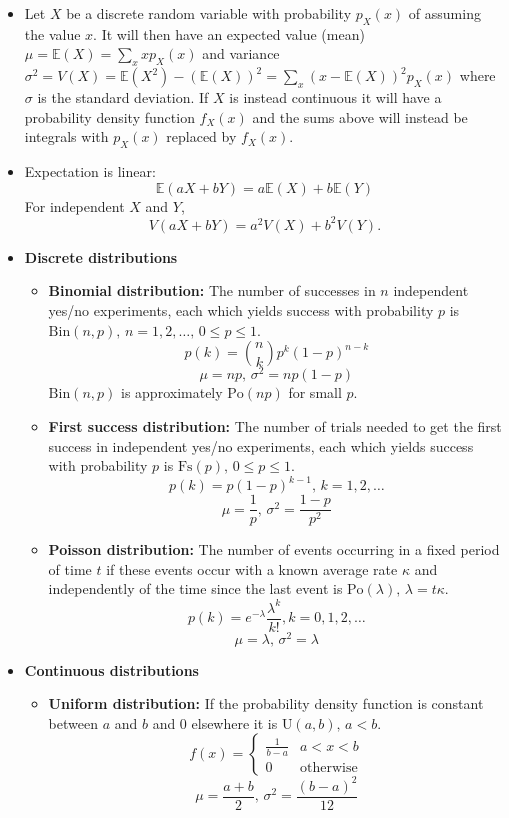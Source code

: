 \vspace{2.5mm}
\begin{itemize}
    \item Let $X$ be a discrete random variable with probability $p_X(x)$ of assuming the value $x$. It will then have an expected value (mean) $\mu=\mathbb{E}(X)=\sum_xxp_X(x)$ and variance $\sigma^2=V(X)=\mathbb{E}(X^2)-(\mathbb{E}(X))^2=\sum_x(x-\mathbb{E}(X))^2p_X(x)$ where $\sigma$ is the standard deviation. If $X$ is instead continuous it will have a probability density function $f_X(x)$ and the sums above will instead be integrals with $p_X(x)$ replaced by $f_X(x)$.

    \item Expectation is linear:
    \[\mathbb{E}(aX+bY) = a\mathbb{E}(X)+b\mathbb{E}(Y)\]
    For independent $X$ and $Y$, \[V(aX+bY) = a^2V(X)+b^2V(Y).\]

    \item \textbf{Discrete distributions}
    \begin{itemize}
        \item \textbf{Binomial distribution:} The number of successes in $n$ independent yes/no experiments, each which yields success with probability $p$ is $\textrm{Bin}(n,p),\,n=1,2,\dots,\, 0\leq p\leq1$.
        \[p(k)=\binom{n}{k}p^k(1-p)^{n-k}\]
        \[\mu = np,\,\sigma^2=np(1-p)\]
        $\textrm{Bin}(n,p)$ is approximately $\textrm{Po}(np)$ for small $p$.

        \item \textbf{First success distribution:} The number of trials needed to get the first success in independent yes/no experiments, each which yields success with probability $p$ is $\textrm{Fs}(p),\,0\leq p\leq1$.
        \[p(k)=p(1-p)^{k-1},\,k=1,2,\dots\]
        \[\mu = \frac1p,\,\sigma^2=\frac{1-p}{p^2}\]

        \item \textbf{Poisson distribution:} The number of events occurring in a fixed period of time $t$ if these events occur with a known average rate $\kappa$ and independently of the time since the last event is $\textrm{Po}(\lambda),\,\lambda=t\kappa$.
        \[p(k)=e^{-\lambda}\frac{\lambda^k}{k!}, k=0,1,2,\dots\]
        \[\mu=\lambda,\,\sigma^2=\lambda\]
    \end{itemize}

    \item \textbf{Continuous distributions}
    \begin{itemize}
        \item \textbf{Uniform distribution:} If the probability density function is constant between $a$ and $b$ and 0 elsewhere it is $\textrm{U}(a,b),\,a<b$.
        \[f(x) = \left\{
        \begin{array}{cl}
        \frac{1}{b-a} & a<x<b\\
        0 & \textrm{otherwise}
        \end{array}\right.\]
        \[\mu=\frac{a+b}{2},\,\sigma^2=\frac{(b-a)^2}{12}\]


\end{itemize}
\end{itemize}
